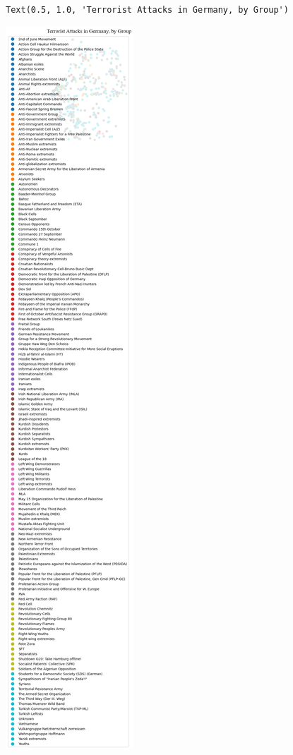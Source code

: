 \documentclass[
  letterpaper,
  DIV=11,
  numbers=noendperiod]{scrreprt}
\begin{document}
\begin{verbatim}
Text(0.5, 1.0, 'Terrorist Attacks in Germany, by Group')
\end{verbatim}

\includegraphics{labs/w02_maps_files/figure-pdf/cell-42-output-2.png}
\end{document}
